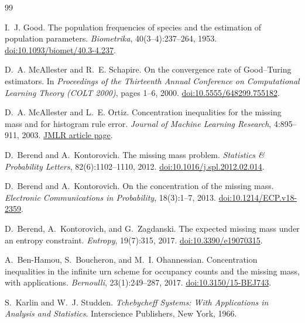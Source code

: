 \documentclass[11pt]{article}
\theoremstyle{plain}
\theoremstyle{definition}
\theoremstyle{remark}
\begin{document}
\begin{thebibliography}{99}

I.~J. Good.
\newblock The population frequencies of species and the estimation of population parameters.
\newblock \emph{Biometrika}, 40(3--4):237--264, 1953.
\newblock \href{https://doi.org/10.1093/biomet/40.3-4.237}{doi:10.1093/biomet/40.3-4.237}.

D.~A. McAllester and R.~E. Schapire.
\newblock On the convergence rate of Good--Turing estimators.
\newblock In \emph{Proceedings of the Thirteenth Annual Conference on Computational Learning Theory (COLT 2000)}, pages 1--6, 2000.
\newblock \href{https://doi.org/10.5555/648299.755182}{doi:10.5555/648299.755182}.

D.~A. McAllester and L.~E. Ortiz.
\newblock Concentration inequalities for the missing mass and for histogram rule error.
\newblock \emph{Journal of Machine Learning Research}, 4:895--911, 2003.
\newblock \href{https://www.jmlr.org/papers/v4/mcallester03a.html}{JMLR article page}.

D.~Berend and A.~Kontorovich.
\newblock The missing mass problem.
\newblock \emph{Statistics \& Probability Letters}, 82(6):1102--1110, 2012.
\newblock \href{https://doi.org/10.1016/j.spl.2012.02.014}{doi:10.1016/j.spl.2012.02.014}.

D.~Berend and A.~Kontorovich.
\newblock On the concentration of the missing mass.
\newblock \emph{Electronic Communications in Probability}, 18(3):1--7, 2013.
\newblock \href{https://doi.org/10.1214/ECP.v18-2359}{doi:10.1214/ECP.v18-2359}.

D.~Berend, A.~Kontorovich, and G.~Zagdanski.
\newblock The expected missing mass under an entropy constraint.
\newblock \emph{Entropy}, 19(7):315, 2017.
\newblock \href{https://doi.org/10.3390/e19070315}{doi:10.3390/e19070315}.

A.~Ben-Hamou, S.~Boucheron, and M.~I. Ohannessian.
\newblock Concentration inequalities in the infinite urn scheme for occupancy counts and the missing mass, with applications.
\newblock \emph{Bernoulli}, 23(1):249--287, 2017.
\newblock \href{https://doi.org/10.3150/15-BEJ743}{doi:10.3150/15-BEJ743}.

S.~Karlin and W.~J. Studden.
\newblock \emph{Tchebycheff Systems: With Applications in Analysis and Statistics}.
\newblock Interscience Publishers, New York, 1966.


\end{thebibliography}
\end{document}
